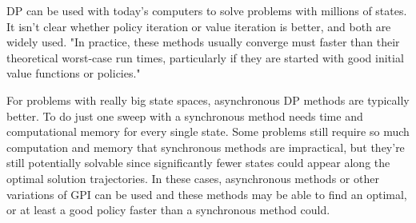 \documentclass[11pt]{article}
\begin{document}
DP can be used with today's computers to solve problems with millions of
states. It isn't clear whether policy iteration or value iteration is
better, and both are widely used. "In practice, these methods usually
converge must faster than their theoretical worst-case run times,
particularly if they are started with good initial value functions or
policies."

For problems with really big state spaces, asynchronous DP methods are
typically better. To do just one sweep with a synchronous method needs
time and computational memory for every single state. Some problems
still require so much computation and memory that synchronous methods
are impractical, but they're still potentially solvable since
significantly fewer states could appear along the optimal solution
trajectories. In these cases, asynchronous methods or other variations
of GPI can be used and these methods may be able to find an optimal, or
at least a good policy faster than a synchronous method could.


    
    
    
    
\end{document}
